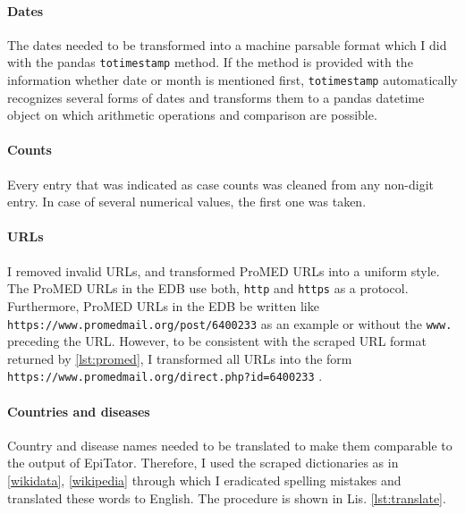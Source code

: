 \paragraph{Dates}
The dates needed to be transformed into a machine parsable format which I did with the pandas \texttt{totimestamp} method. If the method is provided with the information whether date or month is mentioned first, \texttt{totimestamp} automatically recognizes several forms of dates and transforms them to a pandas datetime object on which arithmetic operations and comparison are possible.

\paragraph{Counts}
Every entry that was indicated as case counts was cleaned from any non-digit entry. In case of several numerical values, the first one was taken.

\paragraph{URLs}
I removed invalid URLs, and transformed ProMED URLs into a uniform style. The ProMED URLs in the EDB use both, \texttt{http} and \texttt{https} as a protocol. Furthermore, ProMED URLs in the EDB be written like \textquotesingle \texttt{https://www.promedmail.org/post/6400233} \textquotesingle as an example or without the \texttt{www.} preceding the URL. However, to be consistent with the scraped URL format returned by \ref{lst:promed}, I transformed all URLs into the form \textquotesingle \texttt{https://\allowbreak www.promedmail.org/\allowbreak direct.php?id=6400233} \textquotesingle.

\paragraph{Countries and diseases}
Country and disease names needed to be translated to make them comparable to the output of EpiTator. Therefore, I used the scraped dictionaries as in \ref{wikidata}, \ref{wikipedia} through which I eradicated spelling mistakes and translated these words to English. The procedure is shown in Lis. \ref{lst:translate}.

